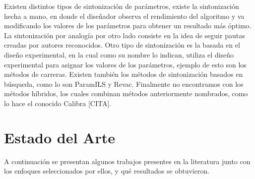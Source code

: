 \documentclass[letter, 10pt]{article}
\begin{document}
\begin{multicols}{2}
Existen distintos tipos de sintonización de parámetros, existe la sintonización hecha a mano, en donde el diseñador observa el rendimiento del algoritmo y va modificando los valores de los parámetros para obtener un resultado más óptimo. La sintonización por analogía por otro lado consiste en la idea de seguir pautas creadas por autores reconocidos. Otro tipo de sintonización es la basada en el diseño experimental, en la cual como su nombre lo indican, utiliza el diseño experimental para asignar los valores de los parámetros, ejemplo de esto son los métodos de carreras. Existen también los métodos de sintonización basados en búsqueda, como lo son ParamILS y Revac. Finalmente no encontramos con los métodos híbridos, los cuales combinan métodos anteriormente nombrados, como lo hace el conocido Calibra [CITA].



\section{Estado del Arte}
A continuación se presentan algunos trabajos presentes en la literatura junto con los enfoques seleccionados por ellos, y qué resultados se obtuvieron.\\


\end{multicols}
\end{document}
